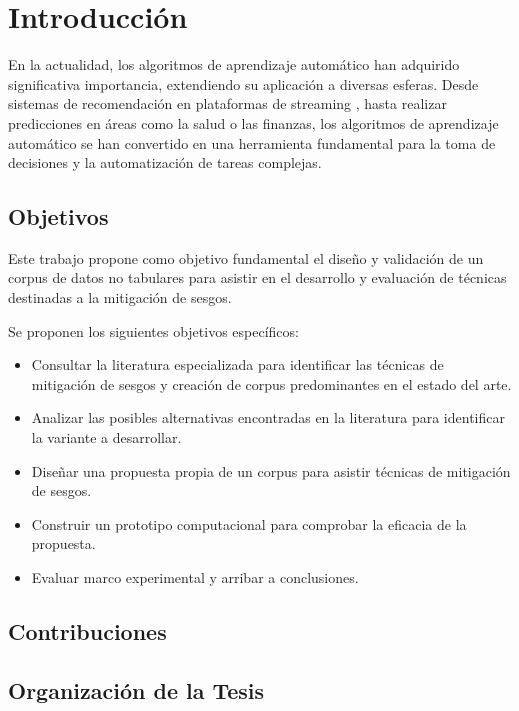 \chapter*{Introducción}\label{chapter:introduction}

En la actualidad, los algoritmos de aprendizaje autom\'atico han adquirido significativa importancia, extendiendo su aplicaci\'on a diversas esferas.
Desde sistemas de recomendaci\'on en plataformas de streaming \parencite{esmaeilzadeh2022abuse, bhattacharya2022augmenting}, hasta realizar predicciones en \'areas como la salud o las finanzas, los algoritmos de aprendizaje
autom\'atico se han convertido en una herramienta fundamental para la toma de decisiones y la automatizaci\'on de tareas complejas.


 

\section*{Objetivos}
Este trabajo propone como objetivo fundamental el dise\~no y validaci\'on de un corpus de datos no tabulares para
asistir en el desarrollo y evaluaci\'on de t\'ecnicas destinadas a la mitigaci\'on de sesgos.

Se proponen los siguientes objetivos espec\'ificos:
\begin{itemize}
    \item Consultar la literatura especializada para identificar las t\'ecnicas de mitigaci\'on de sesgos y creaci\'on
    de corpus predominantes en el estado del arte.
    \item Analizar las posibles alternativas encontradas en la literatura para identificar la variante a desarrollar.
    \item Dise\~nar una propuesta propia de un corpus para asistir t\'ecnicas de mitigaci\'on de sesgos. 
    \item Construir un prototipo computacional para comprobar la eficacia de la propuesta.
    \item Evaluar marco experimental y arribar a conclusiones.
\end{itemize}

\section*{Contribuciones}


\section*{Organizaci\'on de la Tesis}
